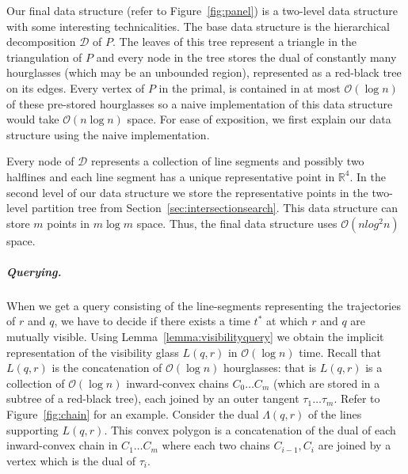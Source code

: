 \documentclass[a4paper, UKenglish]{paper}
\begin{document}
Our final data structure (refer to Figure~\ref{fig:panel}) is a two-level data structure with some interesting technicalities. The base data structure is the hierarchical decomposition $\mathcal{D}$ of $P$. The leaves of this tree represent a triangle in the triangulation of $P$ and every node in the tree stores the dual of constantly many hourglasses (which may be an unbounded region), represented as a red-black tree on its edges. Every vertex of $P$ in the primal, is contained in at most $\mathcal{O}(\log n)$ of these pre-stored hourglasses \cite{guibas1989optimal} so a naive implementation of this data structure would take $\mathcal{O}(n \log n)$ space. For ease of exposition, we first explain our data structure using the naive implementation. 

Every node of $\mathcal{D}$ represents a collection of line segments and possibly two halflines and each line segment has a unique representative point in $\mathbb{R}^4$. In the second level of our data structure we store the representative points in the two-level partition tree from Section~\ref{sec:intersectionsearch}. This data structure can store $m$ points in $m \log m$ space. Thus, the final data structure uses $\mathcal{O}(n log^2 n)$ space.

\subparagraph{Querying.}
When we get a query consisting of the line-segments
representing the trajectories of $r$ and $q$, we have to decide if there exists
a time $t^*$ at which $r$ and $q$ are mutually visible. Using Lemma~\ref{lemma:visibilityquery} we obtain the implicit representation of the visibility glass $L(q,r)$ in $\mathcal{O}(\log n)$ time. Recall that $L(q,r)$ is the concatenation of $\mathcal{O}(\log n)$ hourglasses: that is $L(q,r)$ is a collection of $\mathcal{O}(\log n)$ inward-convex chains $C_0 \ldots C_m$ (which are stored in a subtree of a red-black tree), each joined by an outer tangent $\tau_1 \ldots \tau_{m}$. Refer to Figure~\ref{fig:chain} for an example. Consider the dual $\Lambda(q,r)$ of the lines supporting $L(q,r)$. This convex polygon is a concatenation of the dual of each inward-convex chain in $C_1 \ldots C_m$ where each two chains $C_{i-1}, C_{i}$ are joined by a vertex which is the dual of $\tau_i$. 
\end{document}
